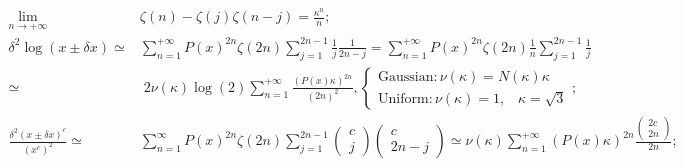 \documentclass[twoside]{article}
\numberwithin{equation}{section}
\newcommand{\eqspace}{\;\;\;}
\begin{document}
\begin{align}
\label{eqn: variance asymptotic}
\lim_{n \rightarrow +\infty}& \zeta(n) - \zeta(j) \zeta(n-j) = \frac{\kappa^n}{n}; \\
\label{eqn: log convergence}
\delta^2 \log(x \pm \delta x) \simeq& \sum_{n = 1}^{+\infty} P(x)^{2n} \zeta(2n) \sum_{j=1}^{2n-1} \frac{1}{j} \frac{1}{2n-j} 
		= \sum_{n = 1}^{+\infty} P(x)^{2n} \zeta(2n) \frac{1}{n} \sum_{j=1}^{2n-1} \frac{1}{j}  \nonumber \\
	\simeq&\; 2\nu(\kappa) \log(2) \sum_{n = 1}^{+\infty} \frac{(P(x) \kappa)^{2n}}{(2n)^2},
		\begin{cases}		
 			\text{Gaussian}:	\nu(\kappa) = N(\kappa) \kappa\\
 			\text{Uniform}:	\nu(\kappa) = 1,\eqspace \kappa = \sqrt{3}
		\end{cases}; \\
\label{eqn: pow convergence}
\frac{\delta^2 (x \pm \delta x)^c}{(x^c)^2} \simeq& \sum_{n=1}^{\infty} P(x)^{2n} \zeta(2n) 
 	\sum_{j=1}^{2n-1} \begin{pmatrix} c \\ j \end{pmatrix} \begin{pmatrix} c \\ 2n - j \end{pmatrix}
	\simeq \nu(\kappa) \sum_{n = 1}^{+\infty} (P(x) \kappa)^{2n} \frac{\begin{pmatrix} 2c \\ 2n \end{pmatrix}}{2n};
\end{align}
\end{document}
